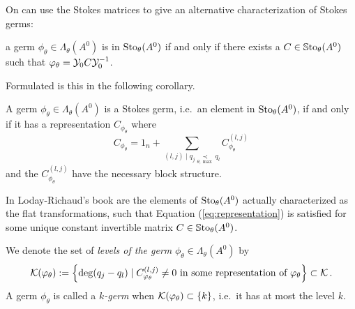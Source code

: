 On can use the Stokes matrices to give an alternative characterization of
Stokes germs:
\begin{einr}
  a germ $\phi_\theta\in\Lambda_\theta(A^0)$ is in $\operatorname{Sto}_\theta(A^0)$ if and
  only if there exists a $C\in\operatorname{\mathbb{S}to}_\theta(A^0)$ such that
  $\varphi_\theta=\mathcal{Y}_{0}C\mathcal{Y}_{0}^{-1}$.
\end{einr}
Formulated is this in the following corollary.
\begin{cor}
  A germ $\phi_\theta\in\Lambda_\theta(A^0)$ is a Stokes germ, i.e.\ an element
  in $\operatorname{Sto}_\theta(A^0)$, if and only if it has a representation
  $C_{\phi_\theta}$ where
  \[
    C_{\phi_\theta}=1_n +
    \sum_{(l,j)\mid q_j\underset{\theta,\max}{\prec}q_l}
    C_{\phi_\theta}^{(l,j)}
  \]
  and the $C_{\phi_\theta}^{(l,j)}$ have the necessary block structure.
  \begin{s-rem}
    In Loday-Richaud's book \cite[78]{Loday2014} are the elements of
    $\operatorname{Sto}_\theta(A^0)$ actually characterized as the flat transformations, such
    that Equation (\ref{eq:representation}) is satisfied for some unique
    constant invertible matrix $C\in\operatorname{\mathbb{S}to}_\theta(A^0)$.
  \end{s-rem}
\end{cor}

\begin{defn}
  We denote the set of \emph{levels of the germ}
  $\phi_{\theta}\in\Lambda_\theta(A^0)$ by
  \[
    \mathcal{K}(\varphi_\theta):= \left\{\deg(q_j-q_l)\mid C_{\varphi_\theta}^{(l,j)}\neq0
      \text{ in some representation of }\varphi_\theta\right\} \subset \mathcal{K} \,.
  \]
  A germ $\phi_\theta$ is called a \emph{$k$-germ} when
  $\mathcal{K}(\varphi_{\theta})\subset\{k\}$, i.e.\ it has at most the level $k$.
\end{defn}

\begin{comment}
  \PROBLEM[This would be good]
  \begin{lem}
    Every $k$-germ in direction $\alpha$ can be extended to the arc
    $U(\frac{\pi}{\max\cK(\phi_\alpha)},\alpha)$.
  \end{lem}
  \begin{proof}
    Use
    \begin{itemize}
      \item \cite[Prop.1.24]{thboalch}
      \item \cite[Sec.III.3.1]{Loday1994}
    \end{itemize}
    or
    \begin{itemize}
      \item multisummability als black box??
    \end{itemize}
  \end{proof}
  \begin{cor}
    Every germ $\phi_\alpha\in\Sto_\alpha(A^0)$ can be extended to the arc
    $U(\frac{\pi}{\max\cK(\phi_\alpha)},\alpha)$, i.e.\ there is a section
    $\phi\in\Gamma\left(U(\frac{\pi}{\max\cK(\phi_\alpha)},\alpha),
    \Lambda(A^0)\right)$
    which has $\phi_\alpha$ as its germ at $\alpha$.
  \end{cor}
\end{comment}

